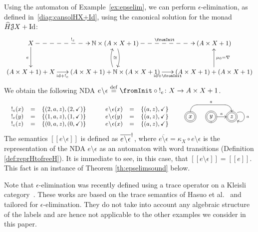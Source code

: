 \documentclass[oribibl,envcountsame,envcountsect,runningheads]{llncs}
\newcommand{\after}{\mathrel{\circ}}
\newcommand{\cat}[1]{\ensuremath{\mathbf{#1}}}
\newcommand{\lift}[1]{\smash{\widehat{#1}}}
\newcommand{\toFinal}[1]{{!_{#1}}}\DeclareMathSymbol{\fromInit}{\mathord}{operators}{"3C}
\newcommand{\N}{\mathbb{N}} \newcommand{\Z}{\mathbb{Z}} \newcommand{\C}{\cat{C}}
\newcommand{\J}{\mathcal{J}}
\newcommand{\fstate}[1]{*++[F=:<10pt>]{#1}}
\renewcommand{\>}{\rangle}
\newcommand{\bb}[1]{[\![ #1 ]\!]}
\def\id{\mathrm{id}}
\def\Id{\mathrm{Id}}
\def\epselim#1{{#1}\!\setminus\! \epsilon}
\begin{document}
\begin{example}
Using the automaton of Example~\ref{ex:epselim}, we can perform $\epsilon$-elimination, as defined in~\eqref{diag:cansolHX+Id}, using the canonical solution for the monad $\lift{H}\J X +\Id$:
\begin{eqnarray*}\small
\vcenter{
    \xymatrix@R=10pt@C=5pt{
    X  \ar@{-->}[rr]^{\toFinal{e}} \ar[dd]_{e} & & \N \times (A\times X +1) \ar@/^/[dd]_{\cong} \ar@{-->}[rr]^{\fromInit} & & (A\times X +1)  \\
     & & & &  \\
     (A\times X +1) + X  \ar[rr]_-{\id  + \toFinal{e}} & & (A\times X +1) + \N \times (A\times X +1)\ar@/^/[uu]
    \ar[rr]_-{\id + \fromInit} & & (A\times X +1) + (A\times X +1) \ar[uu]_{\mu_0 = \nabla}
    }
}
\end{eqnarray*}
We obtain the following NDA $\epselim{e} \stackrel{\mathrm{def}}=\fromInit \circ\toFinal{e} \colon X \to A \times X +1$.
$$\small
\begin{array}{ccc}
\begin{array}{lcl}
 \toFinal{e}(x) &=& \{(2,a,z), (2,\checkmark)\} \\
 \toFinal{e}(y) &=& \{(1,a,z), (1,\checkmark)\} \\
 \toFinal{e}(z) &=& \{(0,a,z), (0,\checkmark) \}
\end{array}\quad
&
\begin{array}{lcl}
 \epselim{e}(x) &=& \{(a,z), \checkmark\} \\
  \epselim{e}(y) &=& \{(a,z), \checkmark\} \\
  \epselim{e} (x) &=& \{(a,z), \checkmark \}
\end{array}
\quad
&
  \xymatrix@C=.5cm{
    \fstate{x}  & \fstate{y} \ar[r]^{a} & \fstate{z} \ar@(ur,dr)[]^{a} \ar@{<-} `u[l] `[ll]_a [ll] }
    \end{array}
$$
The semantics $\bb{\epselim e}$ is defined as $\cansol{\overline{\epselim e}}$, where $\overline{\epselim e}= \kappa_X \after \epselim e$ is the representation of the NDA $\epselim e$ as an automaton with word transitions (Definition \ref{def:reprHtofreeH}). It is immediate to see, in this case, that $\bb{\epselim e}=\bb{e}$. This fact is an instance of Theorem \ref{th:epselimsound} below.
\end{example}
\begin{remark} Note that $\epsilon$-elimination was recently defined using a trace operator on a Kleisli category~\cite{Hasuo06,SW13,Asada}. These works are based on the trace semantics of Hasuo et al.~\cite{HasuoJS:07} and tailored for $\epsilon$-elimination. They do not take into account any algebraic structure of the labels and are hence not applicable to the other examples we consider in this paper. \end{remark}
\end{document}
